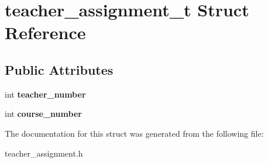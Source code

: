 \hypertarget{structteacher__assignment__t}{}\section{teacher\+\_\+assignment\+\_\+t Struct Reference}
\label{structteacher__assignment__t}
\subsection*{Public Attributes}
\begin{DoxyCompactItemize}
\item 
\mbox{\label{structteacher__assignment__t_a0b4083f8d08c09b00af5ba32c96c4046}} 
int {\bfseries teacher\+\_\+number}
\item 
\mbox{\label{structteacher__assignment__t_ae7aef2377d3d1a4b905afe19c3b4c072}} 
int {\bfseries course\+\_\+number}
\end{DoxyCompactItemize}


The documentation for this struct was generated from the following file\+:\begin{DoxyCompactItemize}
\item 
teacher\+\_\+assignment.\+h\end{DoxyCompactItemize}
